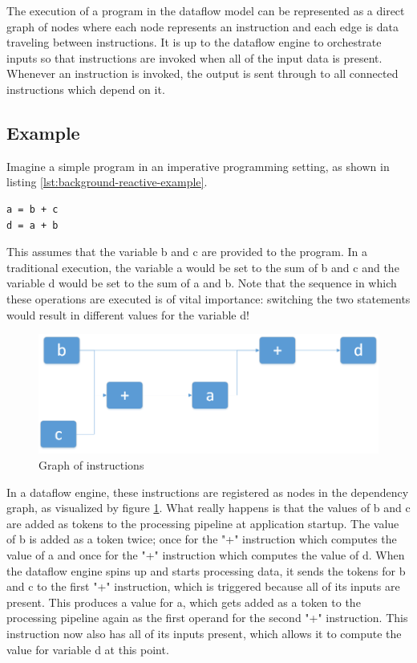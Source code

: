 The execution of a program in the dataflow model can be represented as a direct graph of nodes where each node represents an instruction and each edge is data traveling between instructions. It is up to the dataflow engine to orchestrate inputs so that instructions are invoked when all of the input data is present. Whenever an instruction is invoked, the output is sent through to all connected instructions which depend on it.

\newpage

\subsection{Example}

Imagine a simple program in an imperative programming setting, as shown in listing \ref{lst:background-reactive-example}.

\begin{lstlisting}[caption={A basic data flow program},captionpos=b,label={lst:background-dataflow-example}]
a = b + c
d = a + b
\end{lstlisting}

This assumes that the variable b and c are provided to the program.
In a traditional execution, the variable a would be set to the sum of b and c and the variable d would be set to the sum of a and b. Note that the sequence in which these operations are executed is of vital importance: switching the two statements would result in different values for the variable d!

\begin{figure}[ht]
	\centerline{\includegraphics[width=\textwidth]{images/background-dataflow-example.png}}
	\caption{Graph of instructions}
	\label{fig:background-dataflow-example}
\end{figure}

In a dataflow engine, these instructions are registered as nodes in the dependency graph, as visualized by figure \ref{fig:background-dataflow-example}. What really happens is that the values of b and c are added as tokens to the processing pipeline at application startup. The value of b is added as a token twice; once for the "+" instruction which computes the value of a and once for the "+" instruction which computes the value of d. When the dataflow engine spins up and starts processing data, it sends the tokens for b and c to the first "+" instruction, which is triggered because all of its inputs are present. This produces a value for a, which gets added as a token to the processing pipeline again as the first operand for the second "+" instruction. This instruction now also has all of its inputs present, which allows it to compute the value for variable d at this point.

